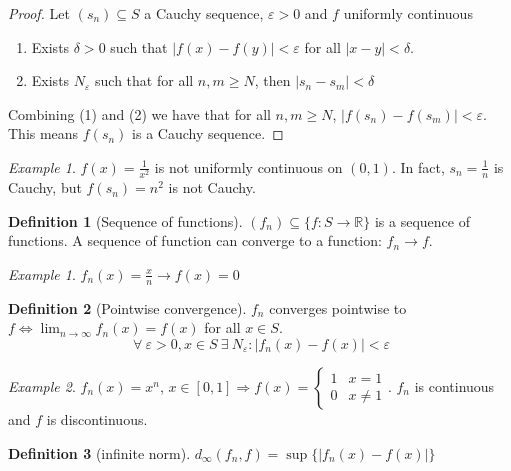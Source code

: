 \documentclass{article}
\newcommand{\DS}{\displaystyle}
\newcommand{\abs}[1]{\left|#1\right|}
\newcommand{\Ar}{\Rightarrow}
\newcommand{\f}[3]{#1 : #2 \rightarrow #3}
\newcommand{\intcc}[1]{\left[#1\right]}
\newcommand{\limn}{\lim_{n \to \infty}}
\theoremstyle{definition}
\newtheorem{definition}{Definition}[section]
\theoremstyle{definition}
\theoremstyle{plain}
\theoremstyle{plain}
\theoremstyle{plain}
\theoremstyle{plain}
\theoremstyle{definition}
\theoremstyle{remark}
\newtheorem{exampled}{Example}[definition]
\theoremstyle{remark}
\theoremstyle{remark}
\newtheorem{examplet}{Example}[theorem]
\theoremstyle{remark}
\newcommand{\R}{\mathbb{R}}
\newcommand{\ForAll}{\ \forall \ }
\newcommand{\Exists}{\ \exists \ }
\newcommand{\E}{\varepsilon}
\begin{document}
\begin{proof}
  Let $(s_n) \subseteq S$ a Cauchy sequence, $\E > 0$ and $f$ uniformly continuous
  \begin{enumerate}
  \item Exists $\delta > 0$ such that $\abs{f(x)-f(y)} < \E$ for all $\abs{x-y} < \delta$.
  \item Exists $N_\E$ such that for all $n,m \geq N$, then $\abs{s_n - s_m} < \delta$
  \end{enumerate}
  Combining (1) and (2) we have that for all $n,m \geq N$, $\abs{f(s_n)-f(s_m)} < \E$. This means $f(s_n)$ is a Cauchy sequence.
\end{proof}

\begin{examplet}
  $f(x) = \frac{1}{x^2}$ is not uniformly continuous on $(0,1)$. In fact, $s_n = \frac{1}{n}$ is Cauchy, but $f(s_n) = n^2$ is not Cauchy.
\end{examplet}


\begin{definition}[Sequence of functions]
  $(f_n) \subseteq \{ \f{f}{S}{\R} \}$ is a sequence of functions. A sequence of function can converge to a function: $f_n \to f$.
\end{definition}

\begin{exampled}
  $f_n(x) = \frac{x}{n} \to f(x) = 0$
\end{exampled}


\begin{definition}[Pointwise convergence]
  $f_n$ converges pointwise to $f \iff \DS \limn{f_n(x)} = f(x)$ for all $x \in S$.
  \[
  \ForAll \E > 0, x \in S \Exists N_\E : \abs{f_n(x) - f(x)} < \E
  \]
\end{definition}

\begin{exampled}
  $f_n(x) = x^n$, $x \in \intcc{0,1} \Ar f(x) = \begin{cases}1 & x = 1 \\ 0 & x \neq 1\end{cases}$. $f_n$ is continuous and $f$ is discontinuous.
\end{exampled}


\begin{definition}[infinite norm]
  $d_\infty(f_n,f) = \sup \{ \abs{f_n(x) - f(x)} \}$
\end{definition}
\end{document}

